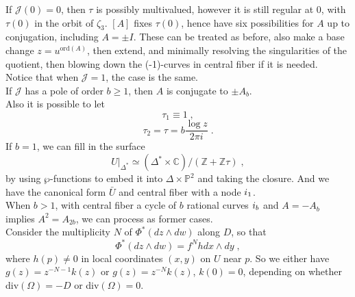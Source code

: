 If $\mathscr{J}(0)=0$, then $\tau$ is possibly multivalued, however it is still regular at 0, with $\tau(0)$ in the orbit of $\zeta_3$. $[A]$ fixes $\tau(0)$, hence have six possibilities for $A$ up to conjugation, including $A=\pm I$. These can be treated as before, also make a base change $z=u^{\textrm{ord}(A)}$, then extend, and minimally resolving the singularities of the quotient, then blowing down the (-1)-curves in central fiber if it is needed.\\ \indent
Notice that when $\mathscr{J}=1$, the case is the same.\\ \indent
If $\mathscr{J}$ has a pole of order $b\geq 1$, then $A$ is conjugate to $\pm A_b$.\\
\indent Also it is possible to let $$\tau_1\equiv 1\;,$$
$$\tau_2=\tau=b\frac{\log z}{2\pi i}\; .$$
\indent If $b=1$, we can fill in the surface 
$$U|_{\Delta^*}\simeq (\Delta^*\times \mathbb{C})/(\mathbb{Z}+\mathbb{Z}\tau)\; ,$$
by using $\wp$-functions to embed it into $\Delta\times \mathbb{P}^2$ and taking the closure. And we have the canonical form $\bar{U}$ and central fiber with a node $\uppercase\expandafter{\romannumeral1}_1$.\\ \indent When $b>1$, with central fiber a cycle of $b$ rational curves $\uppercase\expandafter{\romannumeral1}_b$ and $A=-A_b$ implies $A^2=A_{2b}$, we can process as former cases.\\ \indent
Consider the multiplicity $N$ of $\Phi^*(dz\wedge dw)$ along $D$, so that $$\Phi^*(dz\wedge dw)=f^Nhdx\wedge dy\; ,$$
where $h(p)\neq 0$ in local coordinates $(x,y)$ on $U $ near $p$. So we either have $g(z)=z^{-N-1}k(z)$ or $g(z)=z^{-N}k(z)$, $k(0)=0$, depending on whether div$(\Omega)=-D$ or div$(\Omega)=0$.




